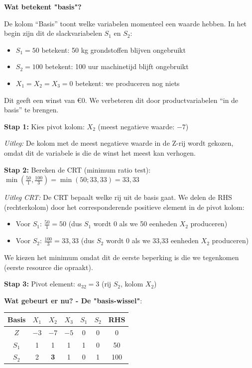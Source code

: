 \documentclass[a4paper,11pt]{article}
\begin{document}
\begin{oefenblok}
    \textbf{Wat betekent "basis"?}

    De kolom ``Basis'' toont welke variabelen momenteel een waarde hebben. In het begin zijn dit de slackvariabelen $S_1$ en $S_2$:
    \begin{itemize}
        \item $S_1 = 50$ betekent: 50 kg grondstoffen blijven ongebruikt
        \item $S_2 = 100$ betekent: 100 uur machinetijd blijft ongebruikt
        \item $X_1 = X_2 = X_3 = 0$ betekent: we produceren nog niets
    \end{itemize}

    Dit geeft een winst van €0. We verbeteren dit door productvariabelen ``in de basis'' te brengen.

    \vspace{0.3cm}

    \textbf{Stap 1:} Kies pivot kolom: $X_2$ (meest negatieve waarde: $-7$)

    \textit{Uitleg:} De kolom met de meest negatieve waarde in de Z-rij wordt gekozen, omdat dit de variabele is die de winst het meest kan verhogen.

    \textbf{Stap 2:} Bereken de CRT (minimum ratio test): $\min\left(\frac{50}{1}, \frac{100}{3}\right) = \min(50; 33{,}33) = 33{,}33$

    \textit{Uitleg CRT:} De CRT bepaalt welke rij uit de basis gaat. We delen de RHS (rechterkolom) door het corresponderende positieve element in de pivot kolom:
    \begin{itemize}
        \item Voor $S_1$: $\frac{50}{1} = 50$ (dus $S_1$ wordt 0 als we 50 eenheden $X_2$ produceren)
        \item Voor $S_2$: $\frac{100}{3} = 33{,}33$ (dus $S_2$ wordt 0 als we 33,33 eenheden $X_2$ produceren)
    \end{itemize}
    We kiezen het minimum omdat dit de eerste beperking is die we tegenkomen (eerste resource die opraakt).

    \textbf{Stap 3:} Pivot element: $a_{32} = 3$ (rij $S_2$, kolom $X_2$)

    \textbf{Wat gebeurt er nu? - De "basis-wissel"}:

    \begin{center}
        \begin{tabular}{c|ccccc|c}
            \hline
            Basis & $X_1$ & $X_2$                  & $X_3$ & $S_1$ & $S_2$ & RHS \\
            \hline
            $Z$   & $-3$  & \cellcolor{red!20}$-7$ & $-5$  & 0     & 0     & 0   \\
            $S_1$ & 1     & \cellcolor{red!20}1    & 1     & 1     & 0     & 50  \\
            \rowcolor{red!20}
            $S_2$ & 2     & \textbf{3}             & 1     & 0     & 1     & 100 \\
            \hline
        \end{tabular}
    \end{center}


\end{oefenblok}
\end{document}
